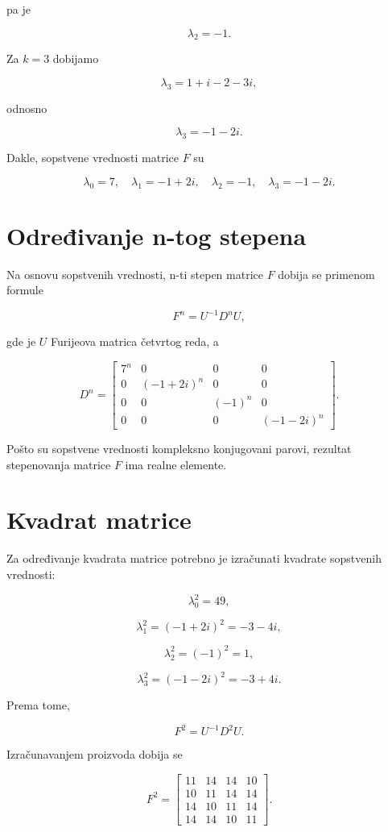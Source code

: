 \documentclass[12pt,a4paper]{report}
\begin{document}
pa je

\[
\boxed{\lambda_2=-1}.
\]

Za \(k=3\) dobijamo

\[
\lambda_3=1+i-2-3i,
\]

odnosno

\[
\boxed{\lambda_3=-1-2i}.
\]

Dakle, sopstvene vrednosti matrice \(F\) su

\[
\boxed{
	\lambda_0=7,\quad
	\lambda_1=-1+2i,\quad
	\lambda_2=-1,\quad
	\lambda_3=-1-2i
}.
\]

\section{Određivanje n-tog stepena}

Na osnovu sopstvenih vrednosti, n-ti stepen matrice \(F\) dobija se primenom formule

\[
F^n=U^{-1}D^nU,
\]

gde je \(U\) Furijeova matrica četvrtog reda, a

\[
D^n=
\begin{bmatrix}
	7^n & 0 & 0 & 0\\
	0 & (-1+2i)^n & 0 & 0\\
	0 & 0 & (-1)^n & 0\\
	0 & 0 & 0 & (-1-2i)^n
\end{bmatrix}.
\]

Pošto su sopstvene vrednosti kompleksno konjugovani parovi, rezultat stepenovanja matrice \(F\) ima realne elemente.

\section{Kvadrat matrice}

Za određivanje kvadrata matrice potrebno je izračunati kvadrate sopstvenih vrednosti:

\[
\lambda_0^2=49,
\]

\[
\lambda_1^2=(-1+2i)^2=-3-4i,
\]

\[
\lambda_2^2=(-1)^2=1,
\]

\[
\lambda_3^2=(-1-2i)^2=-3+4i.
\]

Prema tome,

\[
F^2=U^{-1}D^2U.
\]

Izračunavanjem proizvoda dobija se

\[
\boxed{
	F^2=
	\begin{bmatrix}
		11 & 14 & 14 & 10\\
		10 & 11 & 14 & 14\\
		14 & 10 & 11 & 14\\
		14 & 14 & 10 & 11
	\end{bmatrix}
}.
\]
\end{document}
